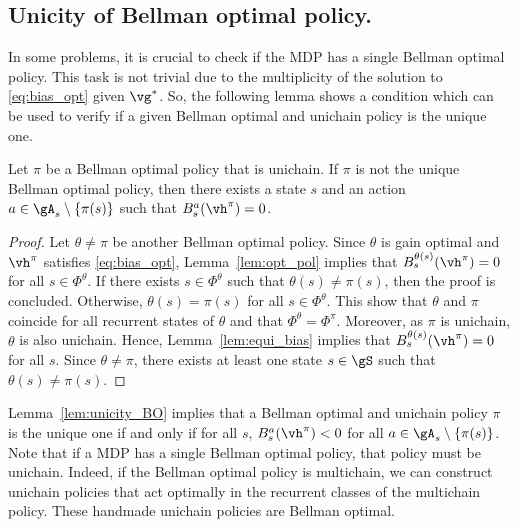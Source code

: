 \subsection{Unicity of Bellman optimal policy.}
\label{ssec:unicity}

In some problems, it is crucial to check if the MDP has a single Bellman optimal policy.
This task is not trivial due to the multiplicity of the solution to \eqref{eq:bias_opt} given $\vg^*$.
So, the following lemma shows a condition which can be used to verify if a given Bellman optimal and unichain policy is the unique one.

\begin{lem}
    \label{lem:unicity_BO}
    Let $\pi$ be a Bellman optimal policy that is unichain. If $\pi$ is not the unique Bellman optimal policy, then there exists a state $s$ and an action $a\in\gA_s\setminus\{\pi(s)\}$ such that $B_s^a(\vh^\pi)=0$.
\end{lem}

\begin{proof}
    Let $\theta\neq\pi$ be another Bellman optimal policy. Since $\theta$ is gain optimal and $\vh^\pi$ satisfies \eqref{eq:bias_opt}, Lemma~\ref{lem:opt_pol} implies that $B_s^{\theta(s)}(\vh^\pi) =0$ for all $s\in\Phi^\theta$. If there exists $s\in\Phi^\theta$ such that $\theta(s)\neq\pi(s)$, then the proof is concluded.  Otherwise, $\theta(s)=\pi(s)$ for all $s\in\Phi^\theta$.
    This show that $\theta$ and $\pi$ coincide for all recurrent states of $\theta$ and that $\Phi^\theta=\Phi^\pi$. Moreover, as $\pi$ is unichain, $\theta$ is also unichain. Hence, Lemma~\ref{lem:equi_bias} implies that $B_s^{\theta(s)}(\vh^\pi)=0$ for all $s$. Since $\theta\neq\pi$, there exists at least one state $s\in\gS$ such that $\theta(s)\neq\pi(s)$.
\end{proof}
Lemma~\ref{lem:unicity_BO} implies that a Bellman optimal and unichain policy $\pi$ is the unique one if and only if for all $s$, $B_s^a(\vh^\pi)<0$ for all $a\in\gA_s\setminus\{\pi(s)\}$.
Note that if a MDP has a single Bellman optimal policy, that policy must be unichain.
Indeed, if the Bellman optimal policy is multichain, we can construct unichain policies that act optimally in the recurrent classes of the multichain policy.
These handmade unichain policies are Bellman optimal.
